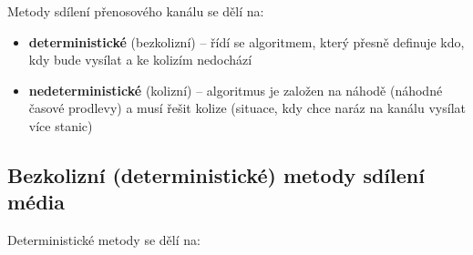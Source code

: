 Metody sdílení přenosového kanálu se dělí na:
\begin{itemize}
	\item \textbf{deterministické} (bezkolizní) -- řídí se algoritmem, který přesně definuje kdo, kdy bude vysílat a ke kolizím nedochází
	\item \textbf{nedeterministické} (kolizní) -- algoritmus je založen na náhodě (náhodné časové prodlevy) a musí řešit kolize (situace, kdy chce naráz na kanálu vysílat více stanic)
\end{itemize}

\subsection{Bezkolizní (deterministické) metody sdílení média}
Deterministické metody se dělí na:

